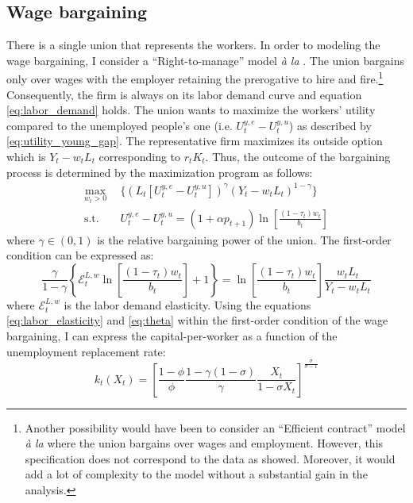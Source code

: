 \subsection{Wage bargaining}\label{subsec:wage_bargaining}
There is a single union that represents the workers. In order to modeling the wage bargaining, I consider a ``Right-to-manage'' model \textit{à la} \cite{Nickell1983}. The union bargains only over wages with the employer retaining the prerogative to hire and fire.\footnote{Another possibility would have been to consider an ``Efficient contract'' model \textit{à la} \cite{McDonald1981} where the union bargains over wages and employment. However, this specification does not correspond to the data as \cite{Bentolila2003} showed. Moreover, it would add a lot of complexity to the model without a substantial gain in the analysis.} Consequently, the firm is always on its labor demand curve and equation \eqref{eq:labor_demand} holds. The union wants to maximize the workers' utility compared to the unemployed people's one (i.e. $U^{y,e}_t - U^{y,u}_t$) as described by \eqref{eq:utility_young_gap}. The representative firm maximizes its outside option which is $Y_t-w_tL_t$ corresponding to $r_t K_t$. Thus, the outcome of the bargaining process is determined by the maximization program as follows:
\begin{align*}
\max_{w_t>0} ~~ &\lbrace \left(L_t[U^{y,e}_t - U^{y,u}_t]\right)^\gamma \left(Y_t-w_tL_t\right)^{1-\gamma}\rbrace\\
\text{s.t.} ~~ &U_t^{y,e} - U_t^{y,u} = (1+\alpha p_{t+1})\ln\left[\frac{(1-\tau_t)w_t}{b_t}\right]
\end{align*}
where $\gamma\in(0,1)$ is the relative bargaining power of the union. The first-order condition can be expressed as:
\begin{equation*}\label{eq:foc_wage_bargaining}
\frac{\gamma}{1-\gamma}\left\lbrace\mathcal{E}^{L,w}_t\ln\left[\frac{(1-\tau_t)w_t}{b_t}\right]+1\right\rbrace = \ln\left[\frac{(1-\tau_t)w_t}{b_t}\right] \frac{w_tL_t}{Y_t-w_tL_t}
\end{equation*}
where $\mathcal{E}^{L,w}_t$ is the labor demand elasticity. Using the equations \eqref{eq:labor_elasticity} and \eqref{eq:theta} within the first-order condition of the wage bargaining, I can express the capital-per-worker as a function of the unemployment replacement rate:
\begin{equation}\label{eq:k(x)}
k_t(X_t) = \left[\frac{1-\phi}{\phi}\frac{1-\gamma(1-\sigma)}{\gamma}\frac{X_t}{1-\sigma X_t}\right]^{\frac{\sigma}{\sigma-1}}
\end{equation}
